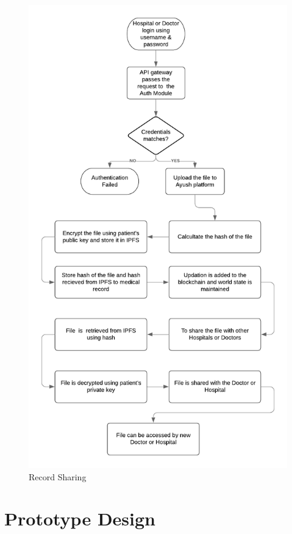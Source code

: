 \documentclass[11pt]{report}
\begin{document}
    \begin{figure}[h!]
        \centering
        \includegraphics[scale=0.8]{F1.png}
        \caption{Record Sharing}
        \label{fig:my_label}
    \end{figure}
    
   \section{Prototype Design} 
\end{document}
